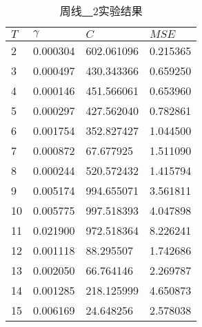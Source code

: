 \begin{table}[ht]
    \centering
    \caption{周线\underline{~~}2实验结果}
    \begin{tabular}{llll}
        \hline
        $T$ &  $\gamma$ &         $C$ &     $MSE$ \\
        \hline
         2 &  0.000304 &  602.061096 &  0.215365 \\
         3 &  0.000497 &  430.343366 &  0.659250 \\
         4 &  0.000146 &  451.566061 &  0.653960 \\
         5 &  0.000297 &  427.562040 &  0.782861 \\
         6 &  0.001754 &  352.827427 &  1.044500 \\
         7 &  0.000872 &   67.677925 &  1.511090 \\
         8 &  0.000244 &  520.572432 &  1.415794 \\
         9 &  0.005174 &  994.655071 &  3.561811 \\
        10 &  0.005775 &  997.518393 &  4.047898 \\
        11 &  0.021900 &  972.518364 &  8.226241 \\
        12 &  0.001118 &   88.295507 &  1.742686 \\
        13 &  0.002050 &   66.764146 &  2.269787 \\
        14 &  0.001285 &  218.125999 &  4.650873 \\
        15 &  0.006169 &   24.648256 &  2.578038 \\
        \hline
    \end{tabular}
\end{table}